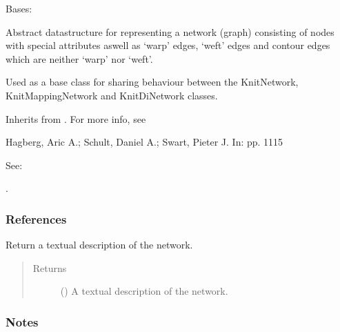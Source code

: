 \documentclass[letterpaper,10pt,english]{sphinxmanual}
\begin{document}
\begin{fulllineitems}
\label{\detokenize{cockatoo:cockatoo.KnitNetworkBase}}
Bases: 

Abstract datastructure for representing a network (graph) consisting of
nodes with special attributes aswell as ‘warp’ edges, ‘weft’ edges and
contour edges which are neither ‘warp’ nor ‘weft’.

Used as a base class for sharing behaviour between the KnitNetwork,
KnitMappingNetwork and KnitDiNetwork classes.

Inherits from .
For more info, see  %
\begin{footnote}[13]\sphinxAtStartFootnote
Hagberg, Aric A.; Schult, Daniel A.; Swart, Pieter J.
In:  pp. 11\sphinxhyphen{}15

See: 
%
\end{footnote}.
\subsubsection*{References}

\begin{fulllineitems}
\label{\detokenize{cockatoo:cockatoo.KnitNetworkBase.ToString}}
Return a textual description of the network.
\begin{quote}\begin{description}
\item[{Returns}] \leavevmode
{} () \textendash{} A textual description of the network.

\end{description}\end{quote}
\subsubsection*{Notes}


\end{fulllineitems}
\end{fulllineitems}
\end{document}
